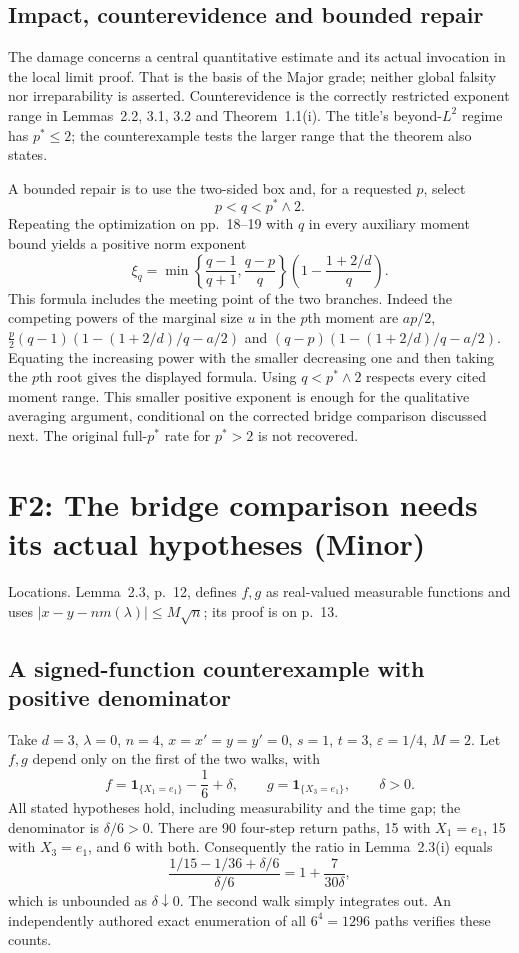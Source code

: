 \documentclass[10pt]{article}
\begin{document}
\subsection*{Impact, counterevidence and bounded repair}
The damage concerns a central quantitative estimate and its actual invocation in the local limit proof. That is the basis of the Major grade; neither global falsity nor irreparability is asserted. Counterevidence is the correctly restricted exponent range in Lemmas 2.2, 3.1, 3.2 and Theorem 1.1(i). The title’s beyond-\(L^2\) regime has \(p^*\leq2\); the counterexample tests the larger range that the theorem also states.\par
A bounded repair is to use the two-sided box and, for a requested \(p\), select \[p<q<p^*\wedge2.\] Repeating the optimization on pp. 18–19 with \(q\) in every auxiliary moment bound yields a positive norm exponent \[\xi_q=\min\left\{\frac{q-1}{q+1},\frac{q-p}{q}\right\}
          \left(1-\frac{1+2/d}{q}\right).\] This formula includes the meeting point of the two branches. Indeed the competing powers of the marginal size \(u\) in the \(p\)th moment are \(ap/2\), \(\frac p2(q-1)(1-(1+2/d)/q-a/2)\) and \((q-p)(1-(1+2/d)/q-a/2)\). Equating the increasing power with the smaller decreasing one and then taking the \(p\)th root gives the displayed formula. Using \(q<p^*\wedge2\) respects every cited moment range. This smaller positive exponent is enough for the qualitative averaging argument, conditional on the corrected bridge comparison discussed next. The original full-\(p^*\) rate for \(p^*>2\) is not recovered.\par
\section*{F2: The bridge comparison needs its actual hypotheses (Minor)}
Locations. Lemma 2.3, p. 12, defines \(f,g\) as real-valued measurable functions and uses \(|x-y-nm(\lambda)|\leq M\sqrt n\); its proof is on p. 13.\par
\subsection*{A signed-function counterexample with positive denominator}
Take \(d=3\), \(\lambda=0\), \(n=4\), \(x=x'=y=y'=0\), \(s=1\), \(t=3\), \(\varepsilon=1/4\), \(M=2\). Let \(f,g\) depend only on the first of the two walks, with \[f=\mathbf 1_{\{X_1=e_1\}}-\frac16+\delta,\qquad
 g=\mathbf 1_{\{X_3=e_1\}},\qquad \delta>0.\] All stated hypotheses hold, including measurability and the time gap; the denominator is \(\delta/6>0\). There are 90 four-step return paths, 15 with \(X_1=e_1\), 15 with \(X_3=e_1\), and 6 with both. Consequently the ratio in Lemma 2.3(i) equals \[\frac{1/15-1/36+\delta/6}{\delta/6}
       =1+\frac{7}{30\delta},\] which is unbounded as \(\delta\downarrow0\). The second walk simply integrates out. An independently authored exact enumeration of all \(6^4=1296\) paths verifies these counts.\par
\end{document}
